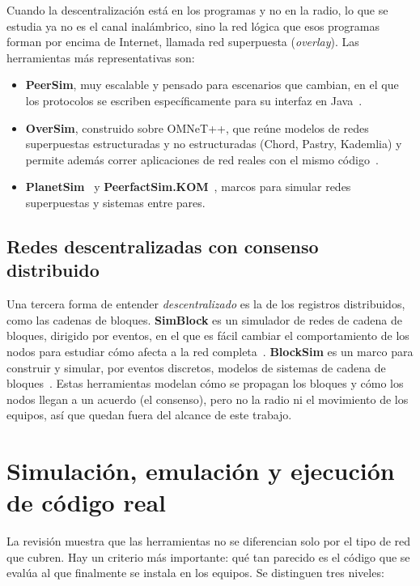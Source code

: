 Cuando la descentralización está en los programas y no en la radio, lo que se
estudia ya no es el canal inalámbrico, sino la red lógica que esos programas forman
por encima de Internet, llamada red superpuesta (\textit{overlay}). Las
herramientas más representativas son:

\begin{itemize}
\item \textbf{PeerSim}, muy escalable y pensado para escenarios que cambian, en el
que los protocolos se escriben específicamente para su interfaz en
Java~\cite{Montresor2009Peersim}.

\item \textbf{OverSim}, construido sobre OMNeT++, que reúne modelos de redes
superpuestas estructuradas y no estructuradas (Chord, Pastry, Kademlia) y permite
además correr aplicaciones de red reales con el mismo
código~\cite{Baumgart2009Oversim}.

\item \textbf{PlanetSim}~\cite{Garcia2005Planetsim} y
\textbf{PeerfactSim.KOM}~\cite{Stingl2011Peerfactsim}, marcos para simular redes
superpuestas y sistemas entre pares.
\end{itemize}

\subsection{Redes descentralizadas con consenso distribuido}
\label{subsec:blockchain}

Una tercera forma de entender \textit{descentralizado} es la de los registros
distribuidos, como las cadenas de bloques. \textbf{SimBlock} es un simulador de
redes de cadena de bloques, dirigido por eventos, en el que es fácil cambiar el
comportamiento de los nodos para estudiar cómo afecta a la red
completa~\cite{Aoki2019Simblock}. \textbf{BlockSim} es un marco para construir y
simular, por eventos discretos, modelos de sistemas de cadena de
bloques~\cite{Alharby2020Blocksim}. Estas herramientas modelan cómo se propagan
los bloques y cómo los nodos llegan a un acuerdo (el consenso), pero no la radio ni
el movimiento de los equipos, así que quedan fuera del alcance de este trabajo.

\section{Simulación, emulación y ejecución de código real}
\label{sec:simulacion-vs-emulacion}

La revisión muestra que las herramientas no se diferencian solo por el tipo de red
que cubren. Hay un criterio más importante: qué tan parecido es el código que se
evalúa al que finalmente se instala en los equipos. Se distinguen tres niveles:

